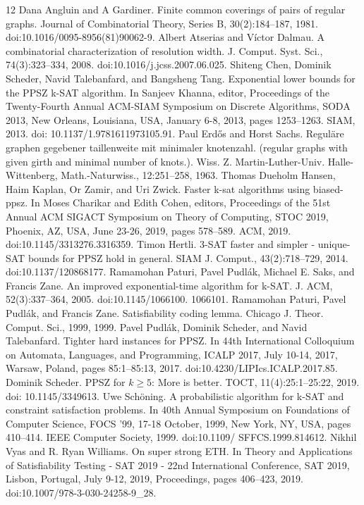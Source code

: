 \documentclass[10pt,a4paper]{article}
\begin{document}
\begin{thebibliography}{12}
 Dana Angluin and A Gardiner. Finite common coverings of pairs of regular graphs. Journal of Combinatorial Theory, Series B, 30(2):184–187, 1981. doi:10.1016/0095-8956(81)90062-9.
 Albert Atserias and Víctor Dalmau. A combinatorial characterization of resolution width. J. Comput. Syst. Sci., 74(3):323–334, 2008. doi:10.1016/j.jcss.2007.06.025.
 Shiteng Chen, Dominik Scheder, Navid Talebanfard, and Bangsheng Tang. Exponential lower bounds for the PPSZ k-SAT algorithm. In Sanjeev Khanna, editor, Proceedings of the Twenty-Fourth Annual ACM-SIAM Symposium on Discrete Algorithms, SODA 2013, New Orleans, Louisiana, USA, January 6-8, 2013, pages 1253–1263. SIAM, 2013. doi: 10.1137/1.9781611973105.91.
 Paul Erdős and Horst Sachs. Reguläre graphen gegebener taillenweite mit minimaler knotenzahl. (regular graphs with given girth and minimal number of knots.). Wiss. Z. Martin-Luther-Univ. Halle-Wittenberg, Math.-Naturwiss., 12:251–258, 1963.
 Thomas Dueholm Hansen, Haim Kaplan, Or Zamir, and Uri Zwick. Faster k-sat algorithms using biased-ppsz. In Moses Charikar and Edith Cohen, editors, Proceedings of the 51st Annual ACM SIGACT Symposium on Theory of Computing, STOC 2019, Phoenix, AZ, USA, June 23-26, 2019, pages 578–589. ACM, 2019. doi:10.1145/3313276.3316359.
 Timon Hertli. 3-SAT faster and simpler - unique-SAT bounds for PPSZ hold in general. SIAM J. Comput., 43(2):718–729, 2014. doi:10.1137/120868177.
 Ramamohan Paturi, Pavel Pudlák, Michael E. Saks, and Francis Zane. An improved exponential-time algorithm for k-SAT. J. ACM, 52(3):337–364, 2005. doi:10.1145/1066100. 1066101.
 Ramamohan Paturi, Pavel Pudlák, and Francis Zane. Satisfiability coding lemma. Chicago J. Theor. Comput. Sci., 1999, 1999.
 Pavel Pudlák, Dominik Scheder, and Navid Talebanfard. Tighter hard instances for PPSZ. In 44th International Colloquium on Automata, Languages, and Programming, ICALP 2017, July 10-14, 2017, Warsaw, Poland, pages 85:1–85:13, 2017. doi:10.4230/LIPIcs.ICALP.2017.85.
 Dominik Scheder. PPSZ for $k\ge5$: More is better. TOCT, 11(4):25:1–25:22, 2019. doi: 10.1145/3349613.
 Uwe Schöning. A probabilistic algorithm for k-SAT and constraint satisfaction problems. In 40th Annual Symposium on Foundations of Computer Science, FOCS ’99, 17-18 October, 1999, New York, NY, USA, pages 410–414. IEEE Computer Society, 1999. doi:10.1109/ SFFCS.1999.814612.
 Nikhil Vyas and R. Ryan Williams. On super strong ETH. In Theory and Applications of Satisfiability Testing - SAT 2019 - 22nd International Conference, SAT 2019, Lisbon, Portugal, July 9-12, 2019, Proceedings, pages 406–423, 2019. doi:10.1007/978-3-030-24258-9\_28.
\end{thebibliography}
\end{document}
